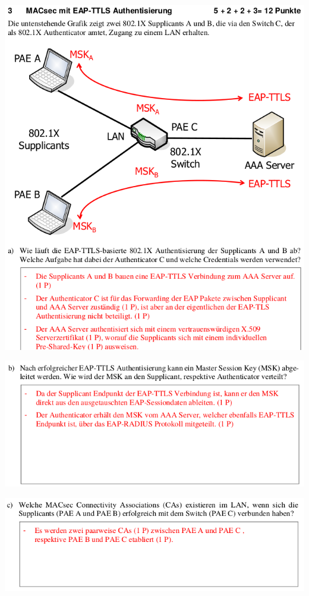 \begin{minipage}[t]{1\textwidth}
    \centering
	\includegraphics[width=0.9\linewidth]{images/hs18-19_macsec_exc1.png}
\end{minipage}

\begin{minipage}[t]{1\textwidth}
    \centering
	\includegraphics[width=0.9\linewidth]{images/hs18-19_macsec_exc2.png}
\end{minipage}

\begin{minipage}[t]{1\textwidth}
    \centering
	\includegraphics[width=0.9\linewidth]{images/hs18-19_macsec_exc3.png}
\end{minipage}

